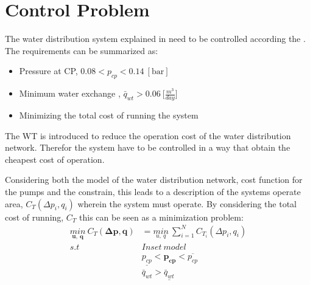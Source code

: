 \section{Control Problem}
\label{control_problem}

The water distribution system explained in  need to be controlled according the . The requirements can be summarized as: 

\begin{itemize}
	\item Pressure at CP, $0.08 < p_{cp} < 0.14 \:[\text{bar}]$
%
	\item Minimum water exchange , $\bar{q}_{wt} > 0.06 \: \big[\frac{m^3}{day}\big]$
%
	\item Minimizing the total cost of running the system
\end{itemize}

The WT is introduced to reduce the operation cost of the water distribution network. Therefor the system have to be controlled in a way that obtain the cheapest cost of operation. 

Considering both the model of the water distribution network, cost function for the pumps and the constrain, this leads to a description of the systems operate area, $C_T(\Delta{p}_i,q_i)$ wherein the system must operate. By considering the total cost of running, $C_T$ this can be seen as a minimization problem:
\begin{align*}
\underset{\pmb{u}, \:\pmb{q}}{min} \: C_T(\pmb{\Delta{p}},\pmb{q}) &= \underset{u, \:q}{min} \: \sum_{i=1}^{N} C_{T_i}(\Delta{p}_i,q_i)  \\
%
s.t \:\:\:\:\: & Inset \:model \\
%
& \underline{p_{cp}} < \pmb{p_{cp}} < \overline{p_{cp}} \\
%
& \bar{q}_{wt} > \underline{\bar{q}_{wt}}
\end{align*}

